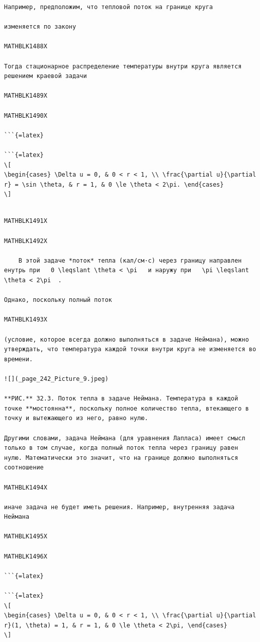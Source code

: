 \documentclass[
]{article}
\begin{document}
\begin{verbatim}
Например, предположим, что тепловой поток на границе круга

изменяется по закону

MATHBLK1488X

Тогда стационарное распределение температуры внутри круга является решением краевой задачи

MATHBLK1489X

MATHBLK1490X

```{=latex}

```{=latex}
\[
\begin{cases} \Delta u = 0, & 0 < r < 1, \\ \frac{\partial u}{\partial r} = \sin \theta, & r = 1, & 0 \le \theta < 2\pi. \end{cases}
\]
\end{verbatim}

\begin{verbatim}

MATHBLK1491X

MATHBLK1492X

    В этой задаче *поток* тепла (кал/см·с) через границу направлен енутрь при   0 \leqslant \theta < \pi   и наружу при   \pi \leqslant \theta < 2\pi  .

Однако, поскольку полный поток

MATHBLK1493X

(условие, которое всегда должно выполняться в задаче Неймана), можно утверждать, что температура каждой точки внутри круга не изменяется во времени.

![](_page_242_Picture_9.jpeg)

**РИС.** 32.3. Поток тепла в задаче Неймана. Температура в каждой точке **мостоянна**, поскольку полное количество тепла, втекающего в точку и вытежающего из него, равно нулю.

Другими словами, задача Неймана (для уравнения Лапласа) имеет смысл только в том случае, когда полный поток тепла через границу равен нулю. Математически это значит, что на границе должно выполняться соотношение

MATHBLK1494X

иначе задача не будет иметь решения. Например, внутренняя задача Неймана

MATHBLK1495X

MATHBLK1496X

```{=latex}

```{=latex}
\[
\begin{cases} \Delta u = 0, & 0 < r < 1, \\ \frac{\partial u}{\partial r}(1, \theta) = 1, & r = 1, & 0 \le \theta < 2\pi, \end{cases}
\]
\end{verbatim}
\end{document}
